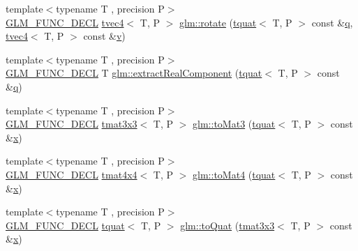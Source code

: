 \begin{DoxyCompactItemize}
\item 
{\footnotesize template$<$typename T , precision P$>$ }\\\mbox{\hyperlink{setup_8hpp_ab2d052de21a70539923e9bcbf6e83a51}{G\+L\+M\+\_\+\+F\+U\+N\+C\+\_\+\+D\+E\+CL}} \mbox{\hyperlink{structglm_1_1tvec4}{tvec4}}$<$ T, P $>$ \mbox{\hyperlink{group__gtx__quaternion_ga96575f8868b3f2aa3e13cab9b94ccbd3}{glm\+::rotate}} (\mbox{\hyperlink{structglm_1_1tquat}{tquat}}$<$ T, P $>$ const \&\mbox{\hyperlink{glad_8h_a514729309336df22bcc8eda979d6ced4}{q}}, \mbox{\hyperlink{structglm_1_1tvec4}{tvec4}}$<$ T, P $>$ const \&\mbox{\hyperlink{glad_8h_a14cfbe2fc2234f5504618905b69d1e06}{v}})
\item 
{\footnotesize template$<$typename T , precision P$>$ }\\\mbox{\hyperlink{setup_8hpp_ab2d052de21a70539923e9bcbf6e83a51}{G\+L\+M\+\_\+\+F\+U\+N\+C\+\_\+\+D\+E\+CL}} T \mbox{\hyperlink{group__gtx__quaternion_ga90de879d97487ec804522dd418e5d8a0}{glm\+::extract\+Real\+Component}} (\mbox{\hyperlink{structglm_1_1tquat}{tquat}}$<$ T, P $>$ const \&\mbox{\hyperlink{glad_8h_a514729309336df22bcc8eda979d6ced4}{q}})
\item 
{\footnotesize template$<$typename T , precision P$>$ }\\\mbox{\hyperlink{setup_8hpp_ab2d052de21a70539923e9bcbf6e83a51}{G\+L\+M\+\_\+\+F\+U\+N\+C\+\_\+\+D\+E\+CL}} \mbox{\hyperlink{structglm_1_1tmat3x3}{tmat3x3}}$<$ T, P $>$ \mbox{\hyperlink{group__gtx__quaternion_ga01935b66ba245c2fd7dee5427d86ce9b}{glm\+::to\+Mat3}} (\mbox{\hyperlink{structglm_1_1tquat}{tquat}}$<$ T, P $>$ const \&\mbox{\hyperlink{glad_8h_a92d0386e5c19fb81ea88c9f99644ab1d}{x}})
\item 
{\footnotesize template$<$typename T , precision P$>$ }\\\mbox{\hyperlink{setup_8hpp_ab2d052de21a70539923e9bcbf6e83a51}{G\+L\+M\+\_\+\+F\+U\+N\+C\+\_\+\+D\+E\+CL}} \mbox{\hyperlink{structglm_1_1tmat4x4}{tmat4x4}}$<$ T, P $>$ \mbox{\hyperlink{group__gtx__quaternion_gaedc9fba6485eade37cc26c16df9d7aad}{glm\+::to\+Mat4}} (\mbox{\hyperlink{structglm_1_1tquat}{tquat}}$<$ T, P $>$ const \&\mbox{\hyperlink{glad_8h_a92d0386e5c19fb81ea88c9f99644ab1d}{x}})
\item 
{\footnotesize template$<$typename T , precision P$>$ }\\\mbox{\hyperlink{setup_8hpp_ab2d052de21a70539923e9bcbf6e83a51}{G\+L\+M\+\_\+\+F\+U\+N\+C\+\_\+\+D\+E\+CL}} \mbox{\hyperlink{structglm_1_1tquat}{tquat}}$<$ T, P $>$ \mbox{\hyperlink{group__gtx__quaternion_gac9e3109ca60b644ce508d6b71a1697bc}{glm\+::to\+Quat}} (\mbox{\hyperlink{structglm_1_1tmat3x3}{tmat3x3}}$<$ T, P $>$ const \&\mbox{\hyperlink{glad_8h_a92d0386e5c19fb81ea88c9f99644ab1d}{x}})

\end{DoxyCompactItemize}
